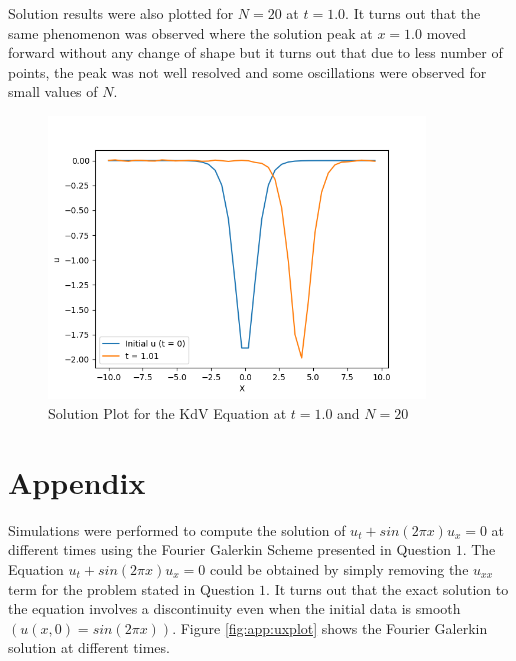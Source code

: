 \documentclass[12pt]{article}
\begin{document}
Solution results were also plotted for $N = 20$ at $t = 1.0$. It turns out that the same phenomenon was observed where the solution peak at $x = 1.0$ moved forward without any change of shape but it turns out that due to less number of points, the peak was not well resolved and some oscillations were observed for small values of $N$.
\begin{figure}
    \centering
    \includegraphics[width = 10cm]{solutionPlot_N=20t = 1.01.png}
    \caption{Solution Plot for the KdV Equation at $t = 1.0$ and $N = 20$}
    \label{fig:Q2_N=64,t=1}
\end{figure}

\section{Appendix}
Simulations were performed to compute the solution of $u_t + sin(2 \pi x)u_x = 0$ at different times using the Fourier Galerkin Scheme presented in Question $1$. The Equation $u_t + sin(2 \pi x)u_x = 0$ could be obtained by simply removing the $u_{xx}$ term for the problem stated in Question $1$. It turns out that the exact solution to the equation involves a discontinuity even when the initial data is smooth $(u(x, 0) = sin(2 \pi x))$. Figure \ref{fig:app:uxplot} shows the Fourier Galerkin solution at different times.
\end{document}
